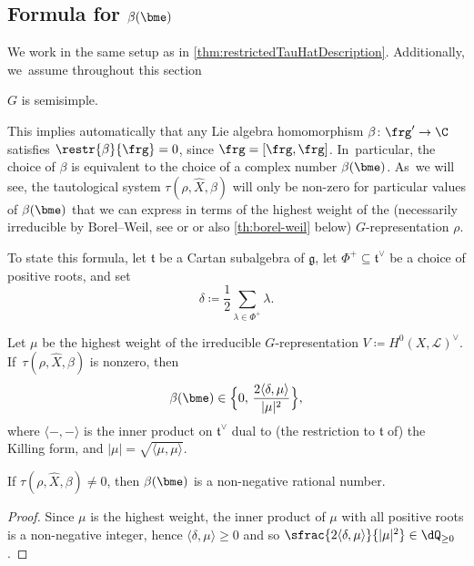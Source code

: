 \subsection{Formula for \texorpdfstring{$\beta(\bme)$}{beta(e)}}
We work in the same setup as in \cref{thm:restrictedTauHatDescription}. Additionally, we~assume throughout this section

\begin{center}
$G$ is semisimple.
\end{center}
This implies automatically that any Lie algebra homomorphism $\beta \colon \frg' \to \C$ satisfies $\restr{\beta}{\frg} = 0$, since $\frg = [\frg, \frg]$. In~particular, the choice of $\beta$ is equivalent to the choice of a complex number $\beta(\bme)$. As~we will see, the tautological system $\tau(\rho, \hat{X},\beta)$ will only be non-zero for particular values of $\beta(\bme)$ that we can express in terms of the highest weight of the (necessarily irreducible by Borel--Weil, see \eg \cite{Ser54} or \cite[Cor.\,to\,Th.\,V]{Bot57} or also \cref{th:borel-weil} below) $G$-representation $\rho$.

To state this formula, let $\mathfrak{t}$ be a Cartan subalgebra of $\mathfrak{g}$, let $\Phi^+\subseteq \mathfrak{t}^\vee$ be a choice of positive roots, and set
\[
\delta\coloneqq \frac{1}{2}\sum_{\lambda\in \Phi^+} \lambda.
\]

\begin{thm}\label{th:reptheory-beta}

Let $\mu$ be the highest weight of the irreducible $G$-representation $V\coloneqq H^0(X, \mathscr{L})^\vee$. If~$\tau(\rho,\hat{X},\beta)$ is nonzero, then
\[
\beta(\bme) \in \Big\{0, \, \frac{2\langle \delta, \mu\rangle}{|\mu|^2}\Big\},
\]
where $\langle-,-\rangle$ is the inner product on $\mathfrak{t}^\vee$ dual to (the restriction to $\mathfrak{t}$ of) the Killing form, and $|\mu|=\sqrt{\langle\mu,\mu\rangle}$.
\end{thm}

\begin{cor}\label{cor:BetaNonNeg}
If $\tau(\rho, \hat X, \beta) \neq 0$, then $\beta(\bme)$ is a non-negative rational number.
\end{cor}

\begin{proof}
Since $\mu$ is the highest weight, the inner product of $\mu$ with all positive roots is a non-negative integer, hence $\langle \delta, \mu \rangle \geq 0$ and so $\sfrac{2\langle \delta, \mu\rangle}{|\mu|^2}\in\dQ_{\geq 0}$.
\end{proof}

